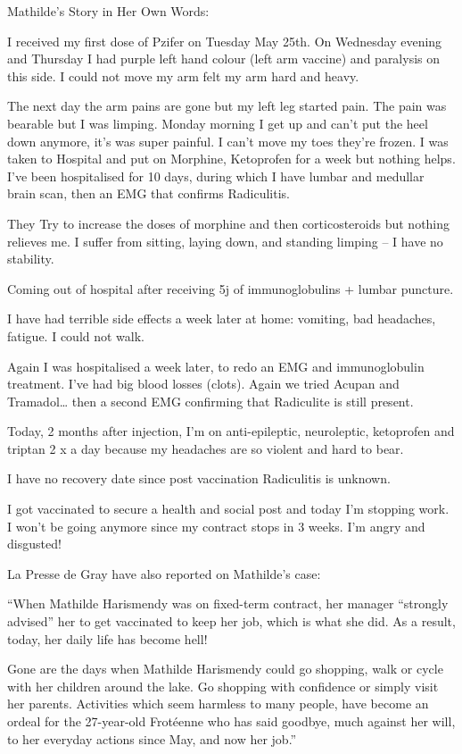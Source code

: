 Mathilde’s Story in Her Own Words:

I received my first dose of Pzifer on Tuesday May 25th. On Wednesday evening and
Thursday I had purple left hand colour (left arm vaccine) and paralysis on this
side. I could not move my arm felt my arm hard and heavy.

The next day the arm pains are gone but my left leg started pain. The pain was
bearable but I was limping. Monday morning I get up and can’t put the heel down
anymore, it’s was super painful. I can’t move my toes they’re frozen.  I was
taken to Hospital and put on Morphine, Ketoprofen for a week but nothing
helps. I’ve been hospitalised for 10 days, during which I have lumbar and
medullar brain scan, then an EMG that confirms Radiculitis.

They Try to increase the doses of morphine and then corticosteroids but nothing
relieves me. I suffer from sitting, laying down, and standing limping – I have
no stability.

Coming out of hospital after receiving 5j of immunoglobulins + lumbar puncture.

I have had terrible side effects a week later at home: vomiting, bad headaches,
fatigue. I could not walk.

Again I was hospitalised a week later, to redo an EMG and immunoglobulin
treatment. I’ve had big blood losses (clots). Again we tried Acupan and
Tramadol… then a second EMG confirming that Radiculite is still present.

Today, 2 months after injection, I’m on anti-epileptic, neuroleptic, ketoprofen
and triptan 2 x a day because my headaches are so violent and hard to bear.

I have no recovery date since post vaccination Radiculitis is unknown.

I got vaccinated to secure a health and social post and today I’m stopping
work. I won’t be going anymore since my contract stops in 3 weeks. I’m angry and
disgusted!

La Presse de Gray have also reported on Mathilde’s case:

“When Mathilde Harismendy was on fixed-term contract, her manager “strongly
advised” her to get vaccinated to keep her job, which is what she did. As a
result, today, her daily life has become hell!

Gone are the days when Mathilde Harismendy could go shopping, walk or cycle with
her children around the lake. Go shopping with confidence or simply visit her
parents. Activities which seem harmless to many people, have become an ordeal
for the 27-year-old Frotéenne who has said goodbye, much against her will, to
her everyday actions since May, and now her job.”


